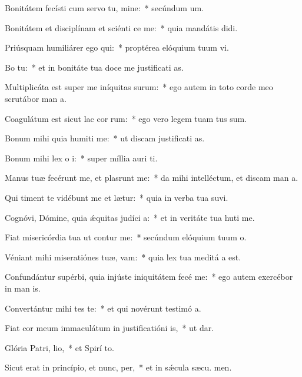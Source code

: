 \item Bonitátem fecísti cum servo tu, mine:~* secúndum  um.
\item Bonitátem et disciplínam et sciénti ce me:~* quia mandátis  didi.
\item Priúsquam humiliárer ego qui:~* proptérea elóquium tuum vi.
\item Bo  tu:~* et in bonitáte tua doce me justificati as.
\item Multiplicáta est super me iníquitas surum:~* ego autem in toto corde meo scrutábor man a.
\item Coagulátum est sicut lac cor rum:~* ego vero legem tuam tus sum.
\item Bonum mihi quia humiti me:~* ut discam justificati as.
\item Bonum mihi lex o i:~* super míllia auri  ti.
\item Manus tuæ fecérunt me, et plasrunt me:~* da mihi intelléctum, et discam man a.
\item Qui timent te vidébunt me et lætur:~* quia in verba tua suvi.
\item Cognóvi, Dómine, quia ǽquitas judíci a:~* et in veritáte tua huti me.
\item Fiat misericórdia tua ut contur me:~* secúndum elóquium tuum  o.
\item Véniant mihi miseratiónes tuæ,  vam:~* quia lex tua meditá a est.
\item Confundántur supérbi, quia injúste iniquitátem fecé  me:~* ego autem exercébor in man is.
\item Convertántur mihi tes te:~* et qui novérunt testimó a.
\item Fiat cor meum immaculátum in justificatióni is,~* ut  dar.
\item Glória Patri,  lio,~* et Spirí to.
\item Sicut erat in princípio, et nunc,  per,~* et in sǽcula sæcu. men.
